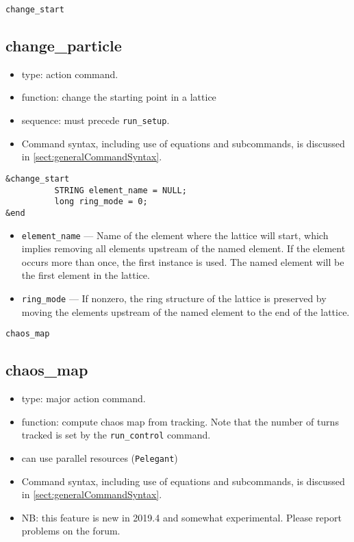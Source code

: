 \documentclass[11pt]{article}
\begin{document}
\newpage
\begin{center}{\Large\verb|change_start|}\end{center}
\subsection{change\_particle\label{subsec:changestart}}

\begin{itemize}
\item type: action command.
\item function: change the starting point in a lattice
\item sequence: must precede \verb|run_setup|.
\item Command syntax, including use of equations and subcommands, is discussed in \ref{sect:generalCommandSyntax}.
\end{itemize}

\begin{verbatim}
&change_start
          STRING element_name = NULL;
          long ring_mode = 0;
&end
\end{verbatim}

\begin{itemize}
\item \verb|element_name| --- Name of the element where the lattice will start, which implies removing all 
  elements upstream of the named element. If the element occurs more than once, the first instance is used.
  The named element will be the first element in the lattice.
\item \verb|ring_mode| --- If nonzero, the ring structure of the lattice is preserved by moving the elements 
  upstream of the named element to the end of the lattice.
\end{itemize}

\newpage
\begin{center}{\Large\verb|chaos_map|}\end{center}
\subsection{chaos\_map \label{subsec:chaosmap}}

\begin{itemize}
\item type: major action command.  
\item function: compute chaos map from tracking.
      Note that the number of turns tracked is set by the \verb|run_control| command.
\item can use parallel resources (\verb|Pelegant|)
\item Command syntax, including use of equations and subcommands, is discussed in \ref{sect:generalCommandSyntax}.
\item NB: this feature is new in 2019.4 and somewhat experimental. Please report problems on the forum.
\end{itemize}
\end{document}
